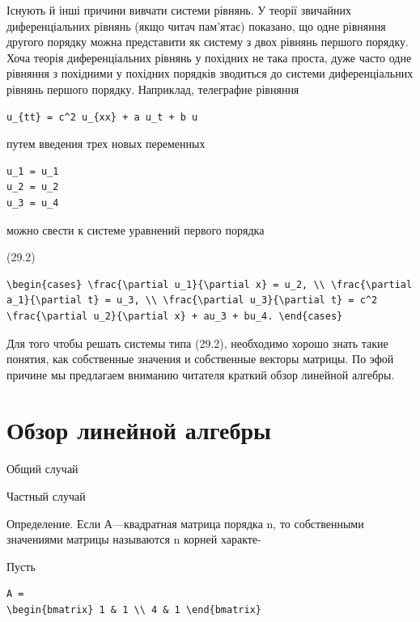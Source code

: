 \documentclass[
  ukrainian,
]{article}
\begin{document}
Існують й інші причини вивчати системи рівнянь. У теорії звичайних
диференціальних рівнянь (якщо читач пам'ятає) показано, що одне рівняння
другого порядку можна представити як систему з двох рівнянь першого
порядку. Хоча теорія диференціальних рівнянь у похідних не така проста,
дуже часто одне рівняння з похідними у похідних порядків зводиться до
системи диференціальних рівнянь першого порядку. Наприклад, телеграфне
рівняння

\begin{verbatim}
u_{tt} = c^2 u_{xx} + a u_t + b u
\end{verbatim}

путем введения трех новых переменных

\begin{verbatim}
u_1 = u_1
u_2 = u_2
u_3 = u_4
\end{verbatim}

можно свести к системе уравнений первого порядка

(29.2)

\begin{verbatim}
\begin{cases} \frac{\partial u_1}{\partial x} = u_2, \\ \frac{\partial a_1}{\partial t} = u_3, \\ \frac{\partial u_3}{\partial t} = c^2 \frac{\partial u_2}{\partial x} + au_3 + bu_4. \end{cases}
\end{verbatim}

Для того чтобы решать системы типа (29.2), необходимо хорошо знать такие
понятия, как собственные значения и собственные векторы матрицы. По эфой
причине мы предлагаем вниманию читателя краткий обзор линейной алгебры.

\section{Обзор линейной
алгебры}\label{ux43eux431ux437ux43eux440-ux43bux438ux43dux435ux439ux43dux43eux439-ux430ux43bux433ux435ux431ux440ux44b}

Общий случай

Частный случай

Определение. Если А---квадратная матрица порядка n, то собственными
значениями матрицы называются n корней характе-

Пусть

\begin{verbatim}
A =
\begin{bmatrix} 1 & 1 \\ 4 & 1 \end{bmatrix}
\end{verbatim}
\end{document}

